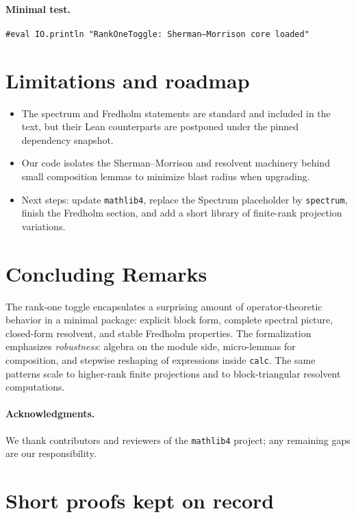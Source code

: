 \documentclass[11pt]{article}
\theoremstyle{definition}
\begin{document}
\paragraph{Minimal test.}
\begin{verbatim}
#eval IO.println "RankOneToggle: Sherman–Morrison core loaded"
\end{verbatim}

\section{Limitations and roadmap}  %
\begin{itemize}
\item The spectrum and Fredholm statements are standard and included in the text, but their Lean counterparts are postponed under the pinned dependency snapshot.
\item Our code isolates the Sherman--Morrison and resolvent machinery behind small composition lemmas to minimize blast radius when upgrading.
\item Next steps: update \texttt{mathlib4}, replace the Spectrum placeholder by \texttt{spectrum}, finish the Fredholm section, and add a short library of finite-rank projection variations.
\end{itemize}

\section{Concluding Remarks}

The rank‑one toggle encapsulates a surprising amount of operator‑theoretic behavior in a minimal package: explicit block form, complete spectral picture, closed‑form resolvent, and stable Fredholm properties.
The formalization emphasizes \emph{robustness}: algebra on the module side, micro-lemmas for composition, and stepwise reshaping of expressions inside \texttt{calc}.
The same patterns scale to higher-rank finite projections and to block-triangular resolvent computations.

\paragraph{Acknowledgments.}
We thank contributors and reviewers of the \texttt{mathlib4} project; any remaining gaps are our responsibility.

\appendix

\section{Short proofs kept on record}
\end{document}
